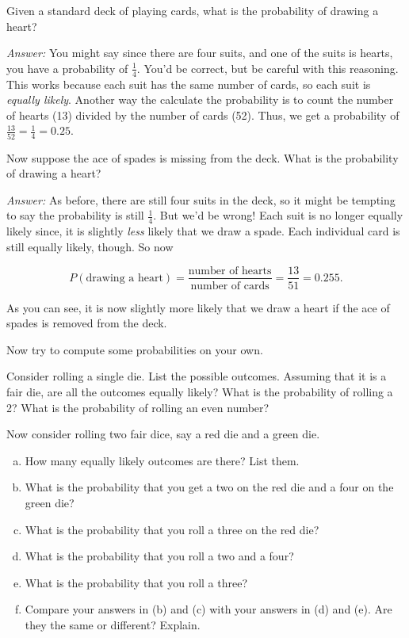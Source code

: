 \begin{example}\label{E:drawheart}
Given a standard deck of playing cards, what is the probability of drawing a heart? 

\emph{Answer:} You might say since there are four suits, and one of the suits is hearts, you have a probability of $\frac{1}{4}$. You'd be correct, but be careful with this reasoning. This works because each suit has the same number of cards, so each suit is \emph{equally likely}. Another way the calculate the probability is to count the number of hearts (13) divided by the number of cards (52). Thus, we get a probability of $\frac{13}{52}=\frac{1}{4}=0.25$. 
\end{example}


\begin{example}\label{E:takeawayspade}
Now suppose the ace of spades is missing from the deck. What is the probability of drawing a heart? 

\emph{Answer:} As before, there are still four suits in the deck, so it might be tempting to say the probability is still $\frac{1}{4}$. But we'd be wrong! Each suit is no longer equally likely since, it is slightly \emph{less} likely that we draw a spade. Each individual card is still equally likely, though. So now

\[ P(\mbox{drawing a heart})= \frac{\mbox{number of hearts}}{\mbox{number of cards}}=\frac{13}{51}= 0.255.\]

As you can see, it is now slightly more likely that we draw a heart if the ace of spades is removed from the deck.
\end{example}

Now try to compute some probabilities on your own.


\begin{xca}
Consider rolling a single die. List the possible outcomes. Assuming that it is a fair die, are all the outcomes equally likely? What is the probability of rolling a 2? What is the probability of rolling an even number? 
\end{xca}




\begin{xca}\label{E:redgreendice}
Now consider rolling two fair dice, say a red die and a green die.
\begin{enumerate}[(a)]
\item  How many equally likely outcomes are there? List them. 
\item What is the probability that you get a two on the red die and a four on the green die? 
\item What is the probability that you roll a three on the red die? 
\item What is the probability that you roll a two and a four? 
\item What is the probability  that you roll a three? 
\item Compare your answers in (b) and (c) with your answers in (d) and (e). Are they the same or different? Explain.
\end{enumerate}
\end{xca}


